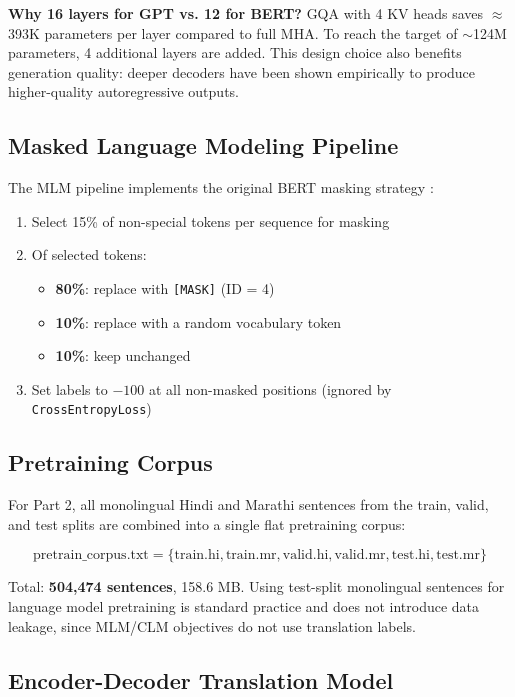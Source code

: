 \documentclass[12pt,a4paper]{article}
\begin{document}
\textbf{Why 16 layers for GPT vs. 12 for BERT?} GQA with 4 KV heads saves $\approx$393K parameters per layer compared to full MHA. To reach the target of $\sim$124M parameters, 4 additional layers are added. This design choice also benefits generation quality: deeper decoders have been shown empirically to produce higher-quality autoregressive outputs.

\subsection{Masked Language Modeling Pipeline}

The MLM pipeline implements the original BERT masking strategy \cite{devlin2019bert}:

\begin{enumerate}
    \item Select 15\% of non-special tokens per sequence for masking
    \item Of selected tokens:
    \begin{itemize}
        \item \textbf{80\%}: replace with \texttt{[MASK]} (ID = 4)
        \item \textbf{10\%}: replace with a random vocabulary token
        \item \textbf{10\%}: keep unchanged
    \end{itemize}
    \item Set labels to $-100$ at all non-masked positions (ignored by \texttt{CrossEntropyLoss})
\end{enumerate}

\subsection{Pretraining Corpus}

For Part 2, all monolingual Hindi and Marathi sentences from the train, valid, and test splits are combined into a single flat pretraining corpus:

\[
\text{pretrain\_corpus.txt} = \{\text{train.hi}, \text{train.mr}, \text{valid.hi}, \text{valid.mr}, \text{test.hi}, \text{test.mr}\}
\]

Total: \textbf{504,474 sentences}, 158.6 MB. Using test-split monolingual sentences for language model pretraining is standard practice and does not introduce data leakage, since MLM/CLM objectives do not use translation labels.

\subsection{Encoder-Decoder Translation Model}
\end{document}
